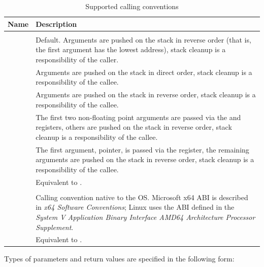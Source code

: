 \documentclass[a4paper,12pt,twoside,extrafontsizes]{memoir}
\begin{document}
\begin{table}[htbp]
	\caption{Supported calling conventions}
	\label{tab:dficconventions}
	\begin{tabularx}{\textwidth}{lL}
		\toprule
		Name & Description \\
		\midrule
		 \\
		\midrule
		
		 & Default. Arguments are pushed on the stack in reverse order (that is, the first argument has the lowest address), stack cleanup is a responsibility of the caller. \\
		 & Arguments are pushed on the stack in direct order, stack cleanup is a responsibility of the callee. \\
		 & Arguments are pushed on the stack in reverse order, stack cleanup is a responsibility of the callee. \\
		 & The first two non-floating point arguments are passed via the  and  registers, others are pushed on the stack in reverse order, stack cleanup is a responsibility of the callee. \\
		 & The first argument,  pointer, is passed via the  register, the remaining arguments are pushed on the stack in reverse order, stack cleanup is a responsibility of the callee. \\
		 & Equivalent to . \\
		
		\midrule
		 \\
		\midrule
		
		 & Calling convention native to the OS. Microsoft x64 ABI is described in \emph{x64 Software Conventions}; Linux uses the ABI defined in the \emph{System V Application Binary Interface AMD64 Architecture Processor Supplement}. \\
		 & Equivalent to . \\
		\bottomrule
	\end{tabularx}
\end{table}

Types of parameters and return values are specified in the following form:

\vspace{\baselineskip}
\vspace{\baselineskip}
\end{document}
